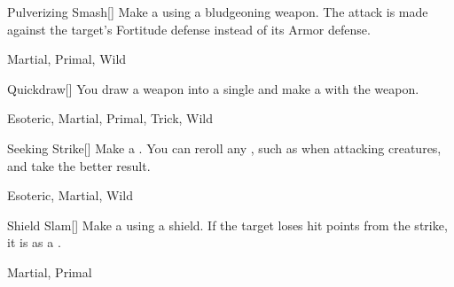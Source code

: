 \lowercase{\hypertarget{maneuver:Pulverizing Smash}{}}\label{maneuver:Pulverizing Smash}
\hypertarget{maneuver:Pulverizing Smash}{}
\begin{freeability}[Rank 1]{Pulverizing Smash}[]
Make a  using a bludgeoning weapon.
The attack is made against the target's Fortitude defense instead of its Armor defense.


 Martial, Primal, Wild
\end{freeability}
\vspace{0.25em}



\lowercase{\hypertarget{maneuver:Quickdraw}{}}\label{maneuver:Quickdraw}
\hypertarget{maneuver:Quickdraw}{}
\begin{freeability}[Rank 1]{Quickdraw}[]
You draw a weapon into a single  and make a  with the weapon.


 Esoteric, Martial, Primal, Trick, Wild
\end{freeability}
\vspace{0.25em}



\lowercase{\hypertarget{maneuver:Seeking Strike}{}}\label{maneuver:Seeking Strike}
\hypertarget{maneuver:Seeking Strike}{}
\begin{freeability}[Rank 1]{Seeking Strike}[]
Make a .
You can reroll any , such as when attacking  creatures, and take the better result.


 Esoteric, Martial, Wild
\end{freeability}
\vspace{0.25em}



\lowercase{\hypertarget{maneuver:Shield Slam}{}}\label{maneuver:Shield Slam}
\hypertarget{maneuver:Shield Slam}{}
\begin{freeability}[Rank 1]{Shield Slam}[]
Make a  using a shield.
If the target loses hit points from the strike, it is  as a .


 Martial, Primal
\end{freeability}
\vspace{0.25em}



